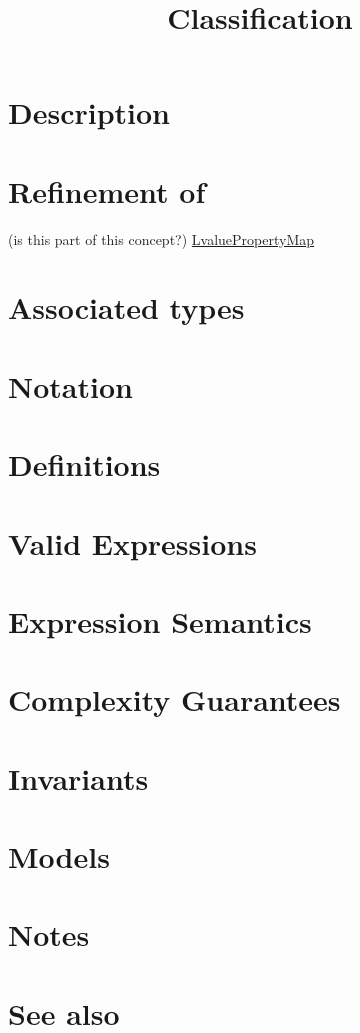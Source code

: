 \documentclass{article}
\begin{document}
\title{Classification}
\maketitle

\section*{Description}
\section*{Refinement of}

(is this part of this concept?)
\href{http://www.boost.org/libs/property_map/LvaluePropertyMap.html}{LvaluePropertyMap}

\section*{Associated types}
\section*{Notation}
\section*{Definitions}
\section*{Valid Expressions}
\section*{Expression Semantics}
\section*{Complexity Guarantees}
\section*{Invariants}
\section*{Models}
\section*{Notes}
\section*{See also}




\end{document}
